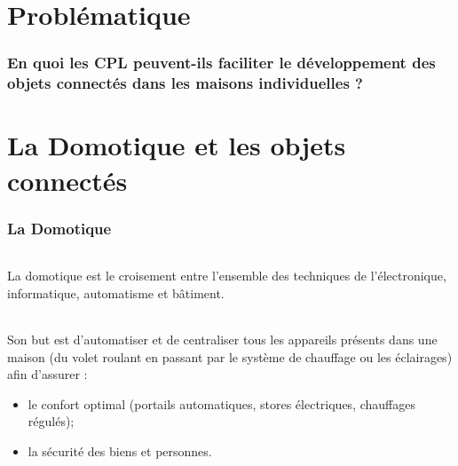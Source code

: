 \part*{Problématique}
    \section*{En quoi les CPL peuvent-ils faciliter le développement des objets connectés dans les maisons individuelles ?}
    \clearpage


\part{La Domotique et les objets connectés}
    \section{La Domotique}
        \paragraph{}
La domotique est le croisement entre l’ensemble des techniques de l’électronique, informatique, automatisme et bâtiment.
        \paragraph{}
Son but est d’automatiser et de centraliser tous les appareils présents dans une maison
(du volet roulant en passant par le système de chauffage ou les éclairages) afin d'assurer :
            \begin{itemize}
                \item le confort optimal (portails automatiques, stores électriques, chauffages régulés);
                \item la sécurité des biens et personnes.
            \end{itemize}
